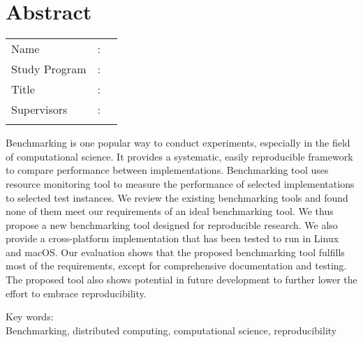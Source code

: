 %
%
%

\chapter*{Abstract}

\vspace*{0.2cm}
{
	\setlength{\parindent}{0pt}

	\begin{tabular}{@{}l l p{10cm}}
		Name&: & \penulis \\
		Study Program&: & \program \\
		Title&: & \judulInggris \\
		Supervisors&: & \pembimbing \\
				   &  & \pembimbingDua \\
	\end{tabular}

	\bigskip
	\bigskip

	Benchmarking is one popular way to conduct experiments, especially in the field of computational science.
	It provides a systematic, easily reproducible framework to compare performance between implementations.
	Benchmarking tool uses resource monitoring tool to measure the performance of selected implementations to selected test instances.
	We review the existing benchmarking tools and found none of them meet our requirements of an ideal benchmarking tool.
	We thus propose a new benchmarking tool designed for reproducible research.
	We also provide a cross-platform implementation that has been tested to run in Linux and macOS.
	Our evaluation shows that the proposed benchmarking tool fulfills most of the requirements, except for comprehensive documentation and testing.
	The proposed tool also shows potential in future development to further lower the effort to embrace reproducibility.

	\bigskip

	Key words:\\
	Benchmarking, distributed computing, computational science, reproducibility
}

\newpage